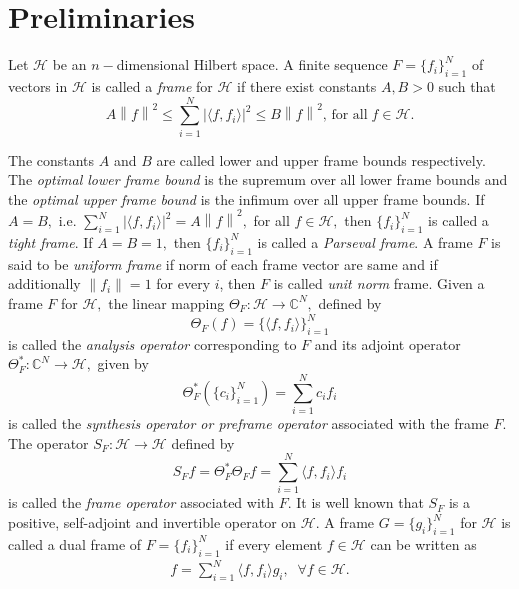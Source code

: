 \documentclass[final,1p,times]{elsarticle}
\begin{document}
	\section{Preliminaries }
	
	Let $\mathcal{H}$  be an $n-$dimensional Hilbert space.  A finite sequence $F= \{f_i\}_{i=1}^N$ of vectors  in $\mathcal{H}$ is called a \textit{frame} for $\mathcal{H}$ if there exist constants $A,B >0$ such that
	$$\displaystyle{A \left\| f \right\|^2\leq \sum_{i=1}^N\big|\langle f,f_i\rangle\big|^2 \leq B\left\| f \right\|^2}, \,\text{for all}\; f\in \mathcal{H}.$$
	
	\noindent
	The constants $A$ and $B$ are called lower and upper frame bounds respectively.  The  \textit{optimal lower frame bound} is the supremum over all lower frame bounds and the \textit{optimal upper frame bound} is the infimum over all upper frame bounds. If $A=B,$ i.e.  $\displaystyle{\sum_{i=1}^N\big| \langle f,f_i \rangle \big|^2 = A\left\| f \right\|^2},$ for all $f\in \mathcal{H},$  then $\{f_i\}_{i=1}^N$ is called a \textit{tight frame}.
	If $A=B=1,$ then $\{f_i\}_{i=1}^N$  is called a \textit{Parseval frame}. A frame $F$ is said to be \textit{uniform frame} if norm of each frame vector are same and if additionally $\|f_i\| = 1$ for every $i$, then $F$ is called \textit{unit norm} frame. Given a frame $F$ for $\mathcal{H},$ the linear mapping $\Theta_F:\mathcal{H} \to  {\mathbb{C}^N}, $ defined by $$\Theta_F(f)= \{\langle f,f_i \rangle\}_{i=1}^N $$  is called the  \textit{analysis operator} corresponding to $F$ and its adjoint operator   $ \Theta_{F}^*: \mathbb{C}^N \to \mathcal{H}, $  given by
	$$\Theta_{F}^*\left(\{c_i\}_{i=1}^N\right) =  \sum_{i=1}^N {c_i f_i} $$ is called the \textit{synthesis operator or preframe operator} associated with the frame $F$.
	The operator $S_F : \mathcal{H}\to \mathcal{H} $  defined by
	$$S_{F}f= \Theta_{F}^{*} \Theta_{F} f = \sum_{i=1}^N \langle f,f_i \rangle f_i $$
	is called the \textit{frame operator} associated with $F.$
	It is well known that $S_F$ is a positive, self-adjoint and invertible operator on $\mathcal{H}.$	A frame $G=\{g_i\}_{i=1}^N$ for $\mathcal{H}$ is called a dual frame of $F= \{f_i\}_{i=1}^N$ if every element $f \in  \mathcal{H}$ can be written as
	\begin{align} \label{eqn2point1reconstruction}
		f = \sum_{i=1}^N\langle f,f_i \rangle g_i,  \;\;   \forall f\in \mathcal{H}.
	\end{align}
\end{document}
